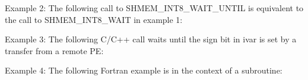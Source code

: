        

       Example 2:  The following call to SHMEM_INT8_WAIT_UNTIL	is  equivalent
       to the call to SHMEM_INT8_WAIT in example 1:

       

       Example	3:   The following C/C++ call waits until the sign bit in ivar
       is set by a transfer from a remote PE:

       

       Example 4:  The following Fortran example is in the context of a
       subroutine:

	

